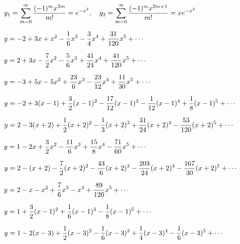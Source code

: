 $\displaystyle{y_{1}=\sum^{\infty}_{m=0}\frac{(-1)^{m}x^{2m}}{m!}=e^{-x^{2}},\quad
y_{2}=\sum^{\infty}_{m=0}\frac{(-1)^{m}x^{2m+1}}{m!}=xe^{-x^{2}}}$

$y=\displaystyle{-2+3x+x^{2}-\frac{1}{6}x^{3}-\frac{3}{4}x^{4}+\frac{31}{120}x^{5}+\cdots}$

$y=\displaystyle{2+3x-\frac{7}{2}x^{2}-\frac{5}{6}x^{3}+\frac{41}{24}x^{4}+\frac{41}{120}x^{5}+\cdots}$

$y=\displaystyle{-3+5x-5x^{2}+\frac{23}{6}x^{3}-\frac{23}{12}x^{4}+\frac{11}{30}x^{5}+\cdots}$

$y=\displaystyle{-2+3(x-1)+\frac{3}{2}(x-1)^{2}-\frac{17}{12}(x-1)^{3}-\frac{1}{12}(x-1)^{4}+
\frac{1}{8}(x-1)^{5}+\cdots}$

$y=\displaystyle{2-3(x+2)+\frac{1}{2}(x+2)^{2}-\frac{1}{3}(x+2)^{3}+\frac{31}{24}(x+2)^{4}-
\frac{53}{120}(x+2)^{5}+\cdots}$

$y=\displaystyle{1-2x+\frac{3}{2}x^{2}-\frac{11}{6}x^{3}+\frac{15}{8}x^{4}-\frac{71}{60}x^{5}+\cdots}$

$y=\displaystyle{2-(x+2)-\frac{7}{2}(x+2)^{2}-\frac{43}{6}(x+2)^{3}-\frac{203}{24}(x+2)^{4}-\frac{167}{30}(x+2)^{5}+\cdots}$

$y=\displaystyle{2-x-x^{2}+\frac{7}{6}x^{3}-x^{4}+\frac{89}{120}x^{5}+\cdots}$

$y=\displaystyle{1+\frac{3}{2}(x-1)^{2}+\frac{1}{6}(x-1)^{3}-\frac{1}{8}(x-1)^{5}+\cdots}$

$y=\displaystyle{1-2(x-3)+\frac{1}{2}(x-3)^{2}-\frac{1}{6}(x-3)^{3}+\frac{1}{4}(x-3)^{4}
-\frac{1}{6}(x-3)^{5}+\cdots}$

